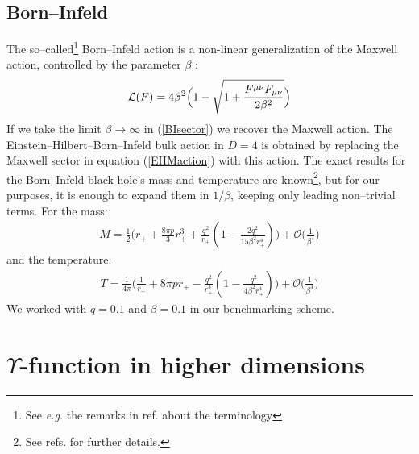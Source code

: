 \documentclass[letterpaper,11pt]{article}
\newcommand{\bea}{\begin{eqnarray}}
\newcommand{\eea}{\end{eqnarray}}
\begin{document}

\subsection{Born--Infeld}
\label{BI}

The so--called\footnote{See {\it e.g.} the remarks in ref.\cite{Johnson:2015fva} about the terminology} Born--Infeld action \cite{Born:1933,Born:1934ji,Born:1934gh} is a non-linear generalization of the Maxwell action, controlled by the parameter $\beta$ :
\bea \label{BIsector}
{ \cal L}(F)=4 \beta^2 \Big(1-\sqrt{1+\frac{F^{\mu \nu}F_{\mu \nu}}{2 \beta^2}}\Big)
\eea
If we take the limit $\beta \rightarrow \infty$ in (\ref{BIsector}) we recover the Maxwell action. The Einstein--Hilbert--Born--Infeld bulk action in $D=4$ is obtained by replacing the Maxwell sector in equation (\ref{EHMaction}) with this action.
The exact results for the Born--Infeld black hole's mass and temperature are known\footnote{See refs. \cite{Fernando:2003tz,Cai:2004eh,Dey:2004yt} for further details.}, but for our purposes, it is enough to expand them in $1/\beta$, keeping only  leading non--trivial terms. For the mass:
\bea
M=\frac{1}{2}\Big(r_{+}+\frac{8 \pi p}{3}r^3_{+}+\frac{q^2}{r_{+}}(1-\frac{2 q^2}{15 \beta^2 r^4_{+}})\Big)+\mathcal{O}\Big(\frac{1}{\beta^4}\Big)
\eea
and the temperature:
\bea
T=\frac{1}{4 \pi}\Big(\frac{1}{r_{+}}+8 \pi p r_{+} - \frac{q^2}{r^3_{+}}(1-\frac{q^2}{4 \beta^2 r^4_{+}})\Big)+\mathcal{O}\Big(\frac{1}{\beta^4}\Big)
\eea
 We  worked with $q=0.1$ and $\beta=0.1$ in our benchmarking scheme.


\section{$\Upsilon$-function in higher dimensions}
\label{Up}
\end{document}
